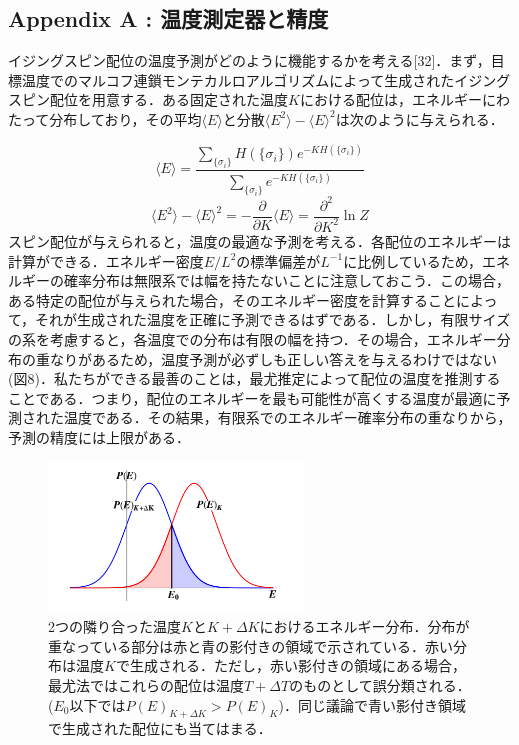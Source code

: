 \documentclass[a4paper,11pt]{jsarticle}
\begin{document}
\subsection*{Appendix A : 温度測定器と精度}
イジングスピン配位の温度予測がどのように機能するかを考える[32]．まず，目標温度でのマルコフ連鎖モンテカルロアルゴリズムによって生成されたイジングスピン配位を用意する．ある固定された温度$K$における配位は，エネルギーにわたって分布しており，その平均$\langle E \rangle$と分散$\langle E^2 \rangle - \langle E \rangle^2$は次のように与えられる．\par
\begin{equation}
  \langle E \rangle = \frac{\sum_{\{ \sigma_i \}}H(\{ \sigma_i \})e^{-KH(\{ \sigma_i \})}}{\sum_{\{ \sigma_i \}}e^{-KH(\{ \sigma_i \})}}
\end{equation}
\begin{equation}
  \langle E^2 \rangle - \langle E \rangle^2
  = -\frac{\partial}{\partial K}\langle E \rangle
  = \frac{\partial^2}{\partial K^2} \ln{Z}
\end{equation}
スピン配位が与えられると，温度の最適な予測を考える．各配位のエネルギーは計算ができる．エネルギー密度$E/L^2$の標準偏差が$L^{-1}$に比例しているため，エネルギーの確率分布は無限系では幅を持たないことに注意しておこう．この場合，ある特定の配位が与えられた場合，そのエネルギー密度を計算することによって，それが生成された温度を正確に予測できるはずである．しかし，有限サイズの系を考慮すると，各温度での分布は有限の幅を持つ．その場合，エネルギー分布の重なりがあるため，温度予測が必ずしも正しい答えを与えるわけではない(図8)．私たちができる最善のことは，最尤推定によって配位の温度を推測することである．つまり，配位のエネルギーを最も可能性が高くする温度が最適に予測された温度である．その結果，有限系でのエネルギー確率分布の重なりから，予測の精度には上限がある．\par
\begin{figure}
  \begin{center}
    \includegraphics[height=4cm]{image/Figure8.png}
    \caption{2つの隣り合った温度$K$と$K+\Delta K$におけるエネルギー分布．分布が重なっている部分は赤と青の影付きの領域で示されている．赤い分布は温度$K$で生成される．ただし，赤い影付きの領域にある場合，最尤法ではこれらの配位は温度$T+\Delta T$のものとして誤分類される．($E_0$以下では$P(E)_{K+ \Delta K} > P(E)_K$)．同じ議論で青い影付き領域で生成された配位にも当てはまる．}
  \end{center}
\end{figure}
\end{document}
